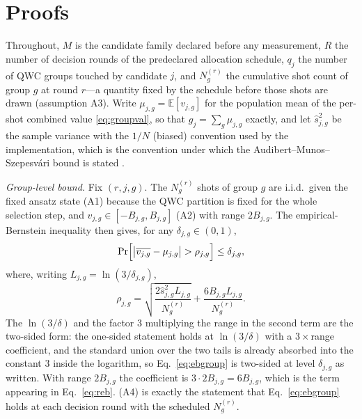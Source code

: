 \documentclass[aps,pra,reprint,superscriptaddress,nofootinbib,floatfix]{revtex4-2}
\begin{document}
\appendix

\section{Proofs}
\label{app:proofs}

Throughout, $M$ is the candidate family declared before any measurement, $R$ the number of decision rounds of the predeclared allocation schedule, $q_j$ the number of QWC groups touched by candidate $j$, and $N_g^{(r)}$ the cumulative shot count of group $g$ at round $r$---a quantity fixed by the schedule before those shots are drawn (assumption A3). Write $\mu_{j,g}=\mathbb E[v_{j,g}]$ for the population mean of the per-shot combined value \eqref{eq:groupval}, so that $g_j=\sum_{g}\mu_{j,g}$ exactly, and let $\widehat s^2_{j,g}$ be the sample variance with the $1/N$ (biased) convention used by the implementation, which is the convention under which the Audibert--Munos--Szepesv\'ari bound is stated \cite{audibert2009exploration}.

\emph{Group-level bound.} Fix $(r,j,g)$. The $N_g^{(r)}$ shots of group $g$ are i.i.d.\ given the fixed ansatz state (A1) because the QWC partition is fixed for the whole selection step, and $v_{j,g}\in[-B_{j,g},B_{j,g}]$ (A2) with range $2B_{j,g}$. The empirical-Bernstein inequality then gives, for any $\delta_{j,g}\in(0,1)$,
\begin{equation}
\Pr\Bigl[\bigl|\overline{v_{j,g}}-\mu_{j,g}\bigr|>\rho_{j,g}\Bigr]\le\delta_{j,g},
\label{eq:ebgroup}
\end{equation}
where, writing $L_{j,g}=\ln(3/\delta_{j,g})$,
\begin{equation}
\rho_{j,g}=\sqrt{\frac{2\widehat s^2_{j,g}L_{j,g}}{N_g^{(r)}}}+\frac{6B_{j,g}L_{j,g}}{N_g^{(r)}} .
\label{eq:ebradius}
\end{equation}
The $\ln(3/\delta)$ and the factor $3$ multiplying the range in the second term are the two-sided form: the one-sided statement holds at $\ln(3/\delta)$ with a $3\times$range coefficient, and the standard union over the two tails is already absorbed into the constant $3$ inside the logarithm, so Eq.~\eqref{eq:ebgroup} is two-sided at level $\delta_{j,g}$ as written. With range $2B_{j,g}$ the coefficient is $3\cdot 2B_{j,g}=6B_{j,g}$, which is the term appearing in Eq.~\eqref{eq:reb}. (A4) is exactly the statement that Eq.~\eqref{eq:ebgroup} holds at each decision round with the scheduled $N_g^{(r)}$.
\end{document}
